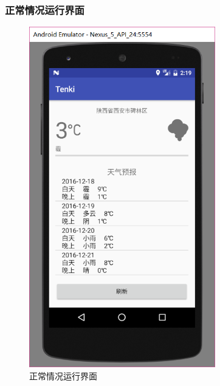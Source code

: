 \documentclass[UTF8]{ctexart}
\begin{document}
      \subsubsection{正常情况运行界面}
        \begin{figure}[H]
          \caption{正常情况运行界面}
          \includegraphics[width=\textwidth, height=40em, keepaspectratio]{正常情况运行界面}
          \centering
        \end{figure}
\end{document}
